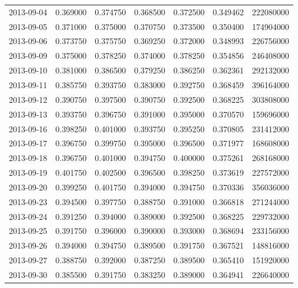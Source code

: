 \begin{tabular}{lrrrrrr}
2013-09-04 &    0.369000 &    0.374750 &    0.368500 &    0.372500 &    0.349462 &   222080000 \\
2013-09-05 &    0.371000 &    0.375000 &    0.370750 &    0.373500 &    0.350400 &   174904000 \\
2013-09-06 &    0.373750 &    0.375750 &    0.369250 &    0.372000 &    0.348993 &   226756000 \\
2013-09-09 &    0.375000 &    0.378250 &    0.374000 &    0.378250 &    0.354856 &   246408000 \\
2013-09-10 &    0.381000 &    0.386500 &    0.379250 &    0.386250 &    0.362361 &   292132000 \\
2013-09-11 &    0.385750 &    0.393750 &    0.383000 &    0.392750 &    0.368459 &   396164000 \\
2013-09-12 &    0.390750 &    0.397500 &    0.390750 &    0.392500 &    0.368225 &   303808000 \\
2013-09-13 &    0.393750 &    0.396750 &    0.391000 &    0.395000 &    0.370570 &   159696000 \\
2013-09-16 &    0.398250 &    0.401000 &    0.393750 &    0.395250 &    0.370805 &   231412000 \\
2013-09-17 &    0.396750 &    0.399750 &    0.395000 &    0.396500 &    0.371977 &   168608000 \\
2013-09-18 &    0.396750 &    0.401000 &    0.394750 &    0.400000 &    0.375261 &   268168000 \\
2013-09-19 &    0.401750 &    0.402500 &    0.396500 &    0.398250 &    0.373619 &   227572000 \\
2013-09-20 &    0.399250 &    0.401750 &    0.394000 &    0.394750 &    0.370336 &   356036000 \\
2013-09-23 &    0.394500 &    0.397750 &    0.388750 &    0.391000 &    0.366818 &   271244000 \\
2013-09-24 &    0.391250 &    0.394000 &    0.389000 &    0.392500 &    0.368225 &   229732000 \\
2013-09-25 &    0.391750 &    0.396000 &    0.390000 &    0.393000 &    0.368694 &   233156000 \\
2013-09-26 &    0.394000 &    0.394750 &    0.389500 &    0.391750 &    0.367521 &   148816000 \\
2013-09-27 &    0.388750 &    0.392000 &    0.387250 &    0.389500 &    0.365410 &   151920000 \\
2013-09-30 &    0.385500 &    0.391750 &    0.383250 &    0.389000 &    0.364941 &   226640000 \\

\end{tabular}
